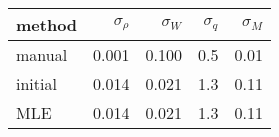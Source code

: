 
\begin{tabular}{lrrrr}
\toprule
method & $\sigma_\rho$ & $\sigma_W$ & $\sigma_q$ & $\sigma_M$\\
\midrule
manual & 0.001 & 0.100 & 0.5 & 0.01\\
initial & 0.014 & 0.021 & 1.3 & 0.11\\
MLE & 0.014 & 0.021 & 1.3 & 0.11\\
\bottomrule
\end{tabular}